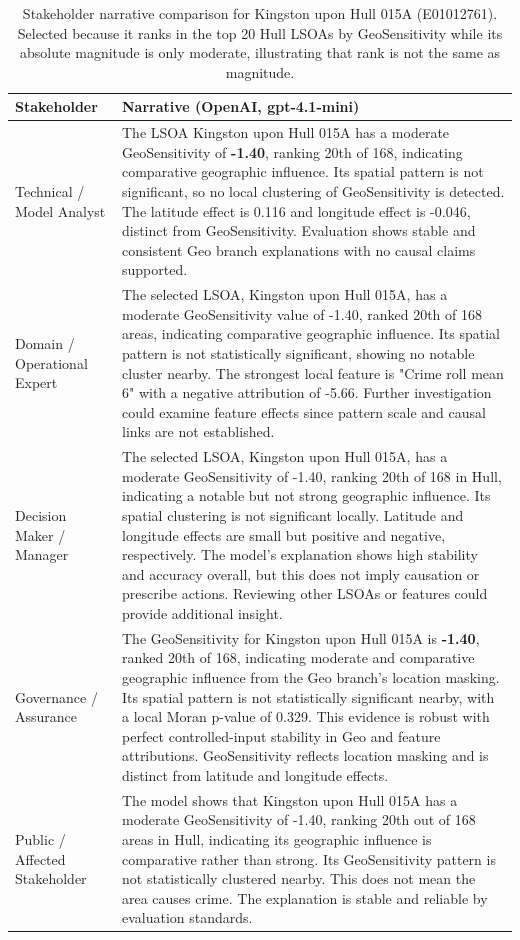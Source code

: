 \begin{table}[H]
\centering
\caption{Stakeholder narrative comparison for Kingston upon Hull 015A (E01012761). Selected because it ranks in the top 20 Hull LSOAs by GeoSensitivity while its absolute magnitude is only moderate, illustrating that rank is not the same as magnitude.}
\label{tab:stakeholder_narratives_rank_vs_magnitude}
\small
\begin{tabularx}{\textwidth}{p{} X}
\toprule
Stakeholder & Narrative (OpenAI, {\ttfamily gpt-4.1-mini}) \\
\midrule
Technical / Model Analyst &
The LSOA Kingston upon Hull 015A has a moderate GeoSensitivity of \textbf{-1.40}, ranking 20th of 168, indicating comparative geographic influence. Its spatial pattern is not significant, so no local clustering of GeoSensitivity is detected. The latitude effect is 0.116 and longitude effect is -0.046, distinct from GeoSensitivity. Evaluation shows stable and consistent Geo branch explanations with no causal claims supported. \\
Domain / Operational Expert &
The selected LSOA, Kingston upon Hull 015A, has a moderate GeoSensitivity value of -1.40, ranked 20th of 168 areas, indicating comparative geographic influence. Its spatial pattern is not statistically significant, showing no notable cluster nearby. The strongest local feature is "Crime roll mean 6" with a negative attribution of -5.66. Further investigation could examine feature effects since pattern scale and causal links are not established. \\
Decision Maker / Manager &
The selected LSOA, Kingston upon Hull 015A, has a moderate GeoSensitivity of -1.40, ranking 20th of 168 in Hull, indicating a notable but not strong geographic influence. Its spatial clustering is not significant locally. Latitude and longitude effects are small but positive and negative, respectively. The model’s explanation shows high stability and accuracy overall, but this does not imply causation or prescribe actions. Reviewing other LSOAs or features could provide additional insight. \\
Governance / Assurance &
The GeoSensitivity for Kingston upon Hull 015A is \textbf{-1.40}, ranked 20th of 168, indicating moderate and comparative geographic influence from the Geo branch's location masking. Its spatial pattern is not statistically significant nearby, with a local Moran p-value of 0.329. This evidence is robust with perfect controlled-input stability in Geo and feature attributions. GeoSensitivity reflects location masking and is distinct from latitude and longitude effects. \\
Public / Affected Stakeholder &
The model shows that Kingston upon Hull 015A has a moderate GeoSensitivity of -1.40, ranking 20th out of 168 areas in Hull, indicating its geographic influence is comparative rather than strong. Its GeoSensitivity pattern is not statistically clustered nearby. This does not mean the area causes crime. The explanation is stable and reliable by evaluation standards. \\
\bottomrule
\end{tabularx}
\end{table}

